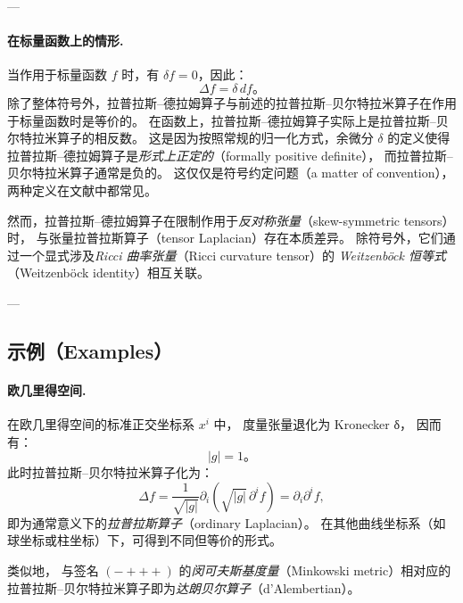 ---

\paragraph{在标量函数上的情形.}
当作用于标量函数 $f$ 时，有 $\delta f = 0$，因此：
\[
\Delta f = \delta\, df。
\]
除了整体符号外，拉普拉斯–德拉姆算子与前述的拉普拉斯–贝尔特拉米算子在作用于标量函数时是等价的。
在函数上，拉普拉斯–德拉姆算子实际上是拉普拉斯–贝尔特拉米算子的相反数。
这是因为按照常规的归一化方式，余微分 $\delta$ 的定义使得拉普拉斯–德拉姆算子是\emph{形式上正定的}（formally positive definite），
而拉普拉斯–贝尔特拉米算子通常是负的。
这仅仅是符号约定问题（a matter of convention），
两种定义在文献中都常见。

然而，拉普拉斯–德拉姆算子在限制作用于\emph{反对称张量}（skew-symmetric tensors）时，
与张量拉普拉斯算子（tensor Laplacian）存在本质差异。
除符号外，它们通过一个显式涉及\emph{Ricci 曲率张量}（Ricci curvature tensor）的
\emph{Weitzenböck 恒等式}（Weitzenböck identity）相互关联。

---

\subsection{示例（Examples）}

\paragraph{欧几里得空间.}
在欧几里得空间的标准正交坐标系 $x^{i}$ 中，
度量张量退化为 Kronecker δ，
因而有：
\[
|g| = 1。
\]
此时拉普拉斯–贝尔特拉米算子化为：
\[
\Delta f
= \frac{1}{\sqrt{|g|}} \partial_{i} \left( \sqrt{|g|}\, \partial^{i} f \right)
= \partial_{i} \partial^{i} f,
\]
即为通常意义下的\emph{拉普拉斯算子}（ordinary Laplacian）。
在其他曲线坐标系（如球坐标或柱坐标）下，可得到不同但等价的形式。

类似地，
与签名 $(- + + +)$ 的\emph{闵可夫斯基度量}（Minkowski metric）相对应的
拉普拉斯–贝尔特拉米算子即为\emph{达朗贝尔算子}（d’Alembertian）。
